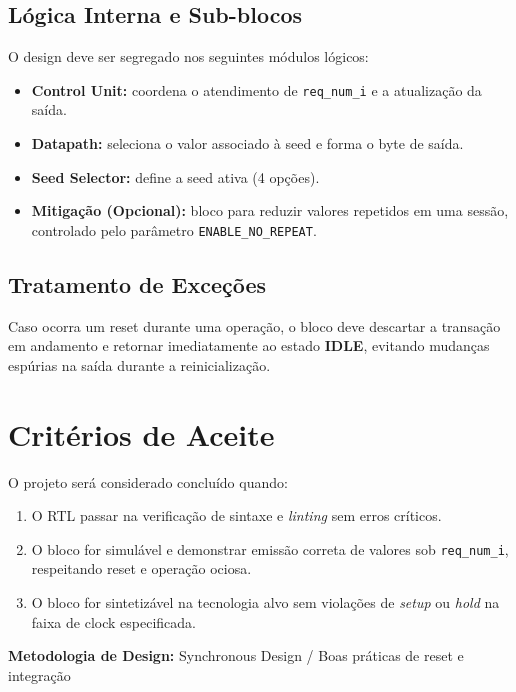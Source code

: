 \documentclass[12pt, a4paper]{article}
\begin{document}
	\subsection{Lógica Interna e Sub-blocos}
	O design deve ser segregado nos seguintes módulos lógicos:
	
	\begin{itemize}
		\item \textbf{Control Unit:} coordena o atendimento de \texttt{req\_num\_i} e a atualização da saída.
		\item \textbf{Datapath:} seleciona o valor associado à seed e forma o byte de saída.
		\item \textbf{Seed Selector:} define a seed ativa (4 opções).
		\item \textbf{Mitigação (Opcional):} bloco para reduzir valores repetidos em uma sessão, controlado pelo parâmetro \texttt{ENABLE\_NO\_REPEAT}.
	\end{itemize}
	
	\subsection{Tratamento de Exceções}
	Caso ocorra um reset durante uma operação, o bloco deve descartar a transação em andamento e retornar imediatamente ao estado \textbf{IDLE}, evitando mudanças espúrias na saída durante a reinicialização.
	
	\section{Critérios de Aceite}
	O projeto será considerado concluído quando:
	\begin{enumerate}
		\item O RTL passar na verificação de sintaxe e \textit{linting} sem erros críticos.
		\item O bloco for simulável e demonstrar emissão correta de valores sob \texttt{req\_num\_i}, respeitando reset e operação ociosa.
		\item O bloco for sintetizável na tecnologia alvo sem violações de \textit{setup} ou \textit{hold} na faixa de clock especificada.
	\end{enumerate}
	
	\vfill
	\begin{center}
		\textbf{Metodologia de Design:} Synchronous Design / Boas práticas de reset e integração
	\end{center}
	
\end{document}
